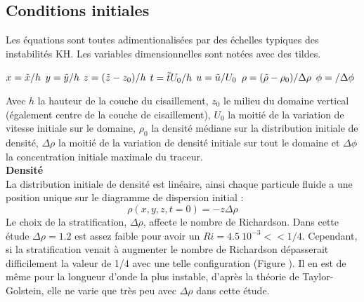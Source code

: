 \documentclass[a4paper,12pt]{article}
\begin{document}
    \subsection{Conditions initiales}
    
    Les équations sont toutes adimentionalisées par des échelles typiques des instabilités KH. Les variables dimensionnelles sont notées avec des tildes. 
    \begin{center}
       $x=\Tilde{x}/h$  \hspace{1cm}  $y=\Tilde{y}/h$  \hspace{1cm}   $z=(\Tilde{z}-z_0)/h$   \hspace{1cm}    $t=\Tilde{t}U_0/h$    \hspace{1cm}  $u=\Tilde{u}/U_{0}$    \hspace{1cm}   $\rho =( \Tilde{\rho}-\rho_0)/\Delta\rho$   \hspace{1cm}     $\phi=\title{\phi}/\Delta\phi$ \\ 
    \end{center}
    Avec $h$ la hauteur de la couche du cisaillement, $z_0$ le milieu du domaine vertical (également centre de la couche de cisaillement), $U_0$ la moitié de la variation de vitesse initiale sur le domaine, $\rho_0$ la densité médiane sur la distribution initiale de densité, $\Delta\rho$ la moitié de la variation de densité initiale sur tout le domaine et $\Delta\phi$ la concentration initiale maximale du traceur. \\
    \newline    
    \textbf{Densité} \\
    La distribution initiale de densité est linéaire, ainsi chaque particule fluide a une position unique sur le diagramme de dispersion initial :
    \begin{equation}
    \label{rho_ini}
        \rho(x,y,z,t=0)=-z\Delta\rho
    \end{equation}
    Le choix de la stratification, $\Delta\rho$, affecte le nombre de Richardson. Dans cette étude $\Delta\rho=1.2$ est assez faible pour avoir un $Ri=4.5\ 10^{-3}<< 1/4$. Cependant, si la stratification venait à augmenter le nombre de Richardson dépasserait difficilement la valeur de 1/4 avec une telle configuration (Figure ). Il en est de même pour la longueur d'onde la plus instable,  d'après la théorie de Taylor-Golstein, elle ne varie que très peu avec $\Delta\rho$ dans cette étude. \\
\end{document}
